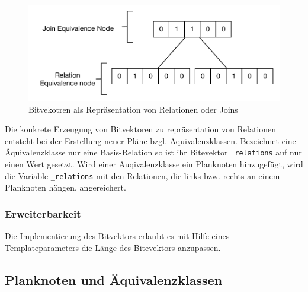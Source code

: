 \begin{figure}[ht]
  \centering
  \includegraphics{04_Implementierung/00_media/Bitvector.pdf}
  \caption{Bitvekotren als Repräsentation von Relationen oder Joins}
  \label{Bitvektor}
\end{figure}


Die konkrete Erzeugung von Bitvektoren zu repräsentation von Relationen entsteht bei der Erstellung neuer Pläne bzgl. Äquivalenzklassen. Bezeichnet eine Äquivalenzklasse nur eine Basis-Relation so ist ihr Bitevektor \texttt{\_relations} auf nur einen Wert gesetzt. Wird einer Äuqivalenzklasse ein Planknoten hinzugefügt, wird die Variable \texttt{\_relations} mit den Relationen, die links bzw. rechts an einem Planknoten hängen, angereichert.



\subsubsection{Erweiterbarkeit}
Die Implementierung des Bitvektors erlaubt es mit Hilfe eines Templateparameters die Länge des Bitevektors anzupassen.



\subsection{Planknoten und Äquivalenzklassen}




